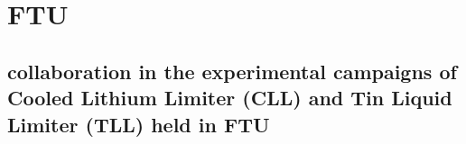 \chapter{FTU}

\section{collaboration in the experimental campaigns of Cooled Lithium Limiter (CLL) and Tin Liquid Limiter (TLL) held in FTU}

